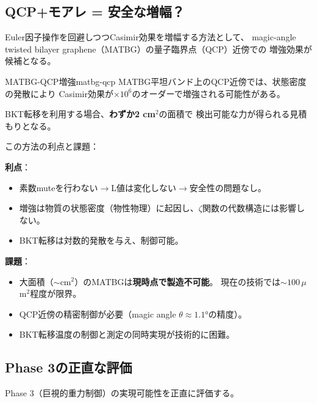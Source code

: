 \documentclass[11pt,a4paper]{article}
\begin{document}
\subsection{QCP+モアレ = 安全な増幅？}
\label{sec:14.4}

Euler因子操作を回避しつつCasimir効果を増幅する方法として、
magic-angle twisted bilayer graphene（MATBG）の量子臨界点（QCP）近傍での
増強効果が候補となる。

\begin{keyresult}{MATBG-QCP増強}{matbg-qcp}
MATBG平坦バンド上のQCP近傍では、状態密度の発散により
Casimir効果が$\times 10^6$のオーダーで増強される可能性がある。

BKT転移を利用する場合、\textbf{わずか2 cm$^2$}の面積で
検出可能な力が得られる見積もりとなる。
\end{keyresult}

\noindent
この方法の利点と課題：

\textbf{利点}：
\begin{itemize}
\item 素数muteを行わない$\to$L値は変化しない$\to$安全性の問題なし。
\item 増強は物質の状態密度（物性物理）に起因し、$\zeta$関数の代数構造には影響しない。
\item BKT転移は対数的発散を与え、制御可能。
\end{itemize}

\textbf{課題}：
\begin{itemize}
\item 大面積（$\sim$cm$^2$）のMATBGは\textbf{現時点で製造不可能}。
  現在の技術では$\sim 100\,\mu$m$^2$程度が限界。
\item QCP近傍の精密制御が必要（magic angle $\theta \approx 1.1°$の精度）。
\item BKT転移温度の制御と測定の同時実現が技術的に困難。
\end{itemize}


\subsection{Phase 3の正直な評価}
\label{sec:14.5}

Phase 3（巨視的重力制御）の実現可能性を正直に評価する。
\end{document}
